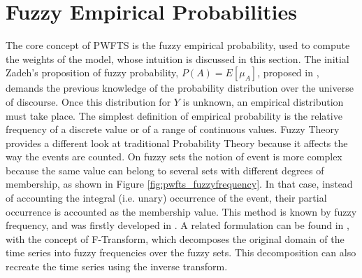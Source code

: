 \section{Fuzzy Empirical Probabilities}
\label{sec:pwfts_empiricalprob}



The core concept of PWFTS is the fuzzy empirical probability, used to compute the weights of the model, whose intuition is discussed in this section. The initial Zadeh's proposition of fuzzy probability, $P(A) = E[\mu_A]$, proposed in \cite{Zadeh1968}, demands the previous knowledge of the probability distribution over the universe of discourse. Once this distribution for $Y$ is unknown, an empirical distribution must take place. The simplest definition of empirical probability is the relative frequency of a discrete value or of a range of continuous values. Fuzzy Theory provides a different look at traditional Probability Theory because it affects the way the events are counted. On fuzzy sets the notion of event is more complex because the same value can belong to several sets with different degrees of membership, as shown in Figure \ref{fig:pwfts_fuzzyfrequency}. In that case, instead of accounting the integral (i.e. unary) occurrence of the event, their partial occurrence is accounted as the membership value. This method is known by fuzzy frequency, and was firstly  developed in \cite{Luo2000}. A related formulation can be found in \cite{Perfilieva2006}, with the concept of F-Transform, which decomposes the original domain of the time series into fuzzy frequencies over the fuzzy sets. This decomposition can also recreate the time series using the inverse transform. 

